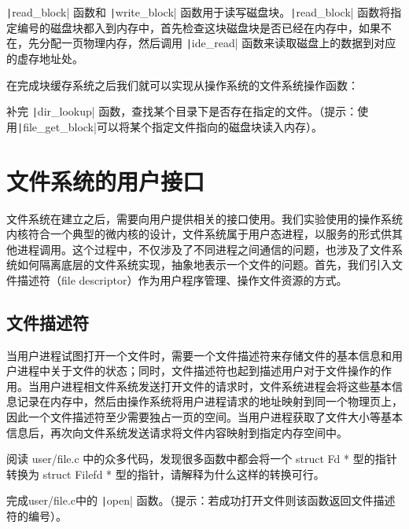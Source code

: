 \texttt|read_block| 函数和 \texttt|write_block| 函数用于读写磁盘块。\texttt|read_block|
函数将指定编号的磁盘块都入到内存中，首先检查这块磁盘块是否已经在内存中，如果不在，先分配一页物理内存，然后调用
\texttt|ide_read| 函数来读取磁盘上的数据到对应的虚存地址处。

在完成块缓存系统之后我们就可以实现从操作系统的文件系统操作函数：

\begin{exercise}
补完 \texttt|dir_lookup| 函数，查找某个目录下是否存在指定的文件。（提示：使用\texttt|file_get_block|可以将某个指定文件指向的磁盘块读入内存）。
\end{exercise}

\section{文件系统的用户接口}

文件系统在建立之后，需要向用户提供相关的接口使用。我们实验使用的操作系统内核符合一个典型的微内核的设计，文件系统属于用户态进程，以服务的形式供其他进程调用。这个过程中，不仅涉及了不同进程之间通信的问题，也涉及了文件系统如何隔离底层的文件系统实现，抽象地表示一个文件的问题。首先，我们引入文件描述符（file descriptor）作为用户程序管理、操作文件资源的方式。

\subsection{文件描述符}

当用户进程试图打开一个文件时，需要一个文件描述符来存储文件的基本信息和用户进程中关于文件的状态；同时，文件描述符也起到描述用户对于文件操作的作用。当用户进程相文件系统发送打开文件的请求时，文件系统进程会将这些基本信息记录在内存中，然后由操作系统将用户进程请求的地址映射到同一个物理页上，因此一个文件描述符至少需要独占一页的空间。当用户进程获取了文件大小等基本信息后，再次向文件系统发送请求将文件内容映射到指定内存空间中。

\begin{thinking}\label{think-Filefd-Fd}
阅读 user/file.c 中的众多代码，发现很多函数中都会将一个 struct Fd * 型的指针转换为 struct Filefd * 型的指针，请解释为什么这样的转换可行。
\end{thinking}

\begin{exercise}
完成user/file.c中的 \texttt|open| 函数。（提示：若成功打开文件则该函数返回文件描述符的编号）。
\end{exercise}

